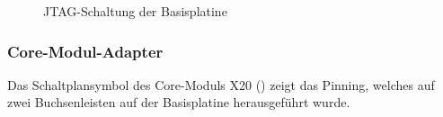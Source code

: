\begin{figure}[H]
    \centering
    \qquad
    \qquad
    \caption[JTAG-Schaltung der Basisplatine]{JTAG-Schaltung der \gls{Basisplatine}}
    \label{fig:basisplatine-jtag}
\end{figure}

\subsubsection{Core-Modul-Adapter}
Das Schaltplansymbol des \gls{Core-Modul}s X20 () zeigt das Pinning, welches auf zwei Buchsenleisten auf der \gls{Basisplatine} herausgeführt wurde.

